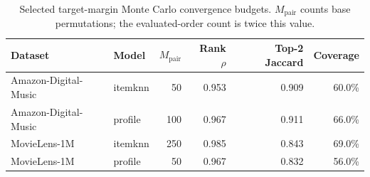 \begin{table}[t]\centering\small
\caption{Selected target-margin Monte Carlo convergence budgets. $M_{\mathrm{pair}}$ counts base permutations; the evaluated-order count is twice this value.}
\label{tab:convergence}
\begin{tabular}{llrrrr}
\toprule
Dataset & Model & $M_{\mathrm{pair}}$ & Rank $\rho$ & Top-2 Jaccard & Coverage \\
\midrule
Amazon-Digital-Music & itemknn & 50 & 0.953 & 0.909 & 60.0\% \\
Amazon-Digital-Music & profile & 100 & 0.967 & 0.911 & 66.0\% \\
MovieLens-1M & itemknn & 250 & 0.985 & 0.843 & 69.0\% \\
MovieLens-1M & profile & 50 & 0.967 & 0.832 & 56.0\% \\
\bottomrule
\end{tabular}
\end{table}
